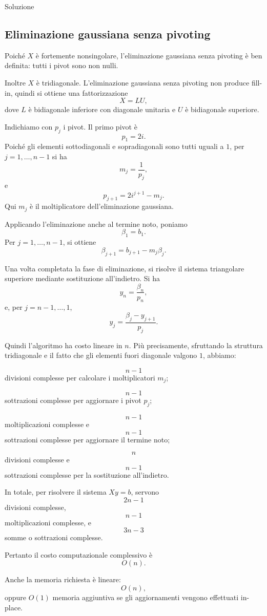 \documentclass[a4paper]{article}
\begin{document}
\begin{snippetsolution}{Soluzione}
    \subsection*{Eliminazione gaussiana senza pivoting}

    Poiché \(X\) è fortemente nonsingolare, l'eliminazione gaussiana senza pivoting è ben definita: tutti i pivot sono non nulli.

    Inoltre \(X\) è tridiagonale. L'eliminazione gaussiana senza pivoting non produce fill-in, quindi si ottiene una fattorizzazione
    \[
        X=LU,
    \]
    dove \(L\) è bidiagonale inferiore con diagonale unitaria e \(U\) è bidiagonale superiore.

    Indichiamo con \(p_j\) i pivot. Il primo pivot è
    \[
        p_1=2i.
    \]
    Poiché gli elementi sottodiagonali e sopradiagonali sono tutti uguali a \(1\), per \(j=1,\dots,n-1\) si ha
    \[
        m_j=\frac{1}{p_j},
    \]
    e
    \[
        p_{j+1}=2i^{j+1}-m_j.
    \]
    Qui \(m_j\) è il moltiplicatore dell'eliminazione gaussiana.

    Applicando l'eliminazione anche al termine noto, poniamo
    \[
        \beta_1=b_1.
    \]
    Per \(j=1,\dots,n-1\), si ottiene
    \[
        \beta_{j+1}=b_{j+1}-m_j\beta_j.
    \]

    Una volta completata la fase di eliminazione, si risolve il sistema triangolare superiore mediante sostituzione all'indietro. Si ha
    \[
        y_n=\frac{\beta_n}{p_n},
    \]
    e, per \(j=n-1,\dots,1\),
    \[
        y_j=\frac{\beta_j-y_{j+1}}{p_j}.
    \]

    Quindi l'algoritmo ha costo lineare in \(n\). Più precisamente, sfruttando la struttura tridiagonale e il fatto che gli elementi fuori diagonale valgono \(1\), abbiamo:

    \[
        n-1
    \]
    divisioni complesse per calcolare i moltiplicatori \(m_j\);

    \[
        n-1
    \]
    sottrazioni complesse per aggiornare i pivot \(p_j\);

    \[
        n-1
    \]
    moltiplicazioni complesse e
    \[
        n-1
    \]
    sottrazioni complesse per aggiornare il termine noto;

    \[
        n
    \]
    divisioni complesse e
    \[
        n-1
    \]
    sottrazioni complesse per la sostituzione all'indietro.

    In totale, per risolvere il sistema \(Xy=b\), servono
    \[
        2n-1
    \]
    divisioni complesse,
    \[
        n-1
    \]
    moltiplicazioni complesse,
    e
    \[
        3n-3
    \]
    somme o sottrazioni complesse.

    Pertanto il costo computazionale complessivo è
    \[
        O(n).
    \]

    Anche la memoria richiesta è lineare:
    \[
        O(n),
    \]
    oppure \(O(1)\) memoria aggiuntiva se gli aggiornamenti vengono effettuati in-place.
\end{snippetsolution}
\end{document}

